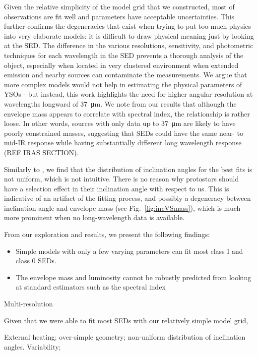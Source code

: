 Given the relative simplicity of the model grid that we constructed, most of observations are fit well and parameters have acceptable uncertainties. This further confirms the degeneracies that exist when trying to put too much physics into very elaborate models: it is difficult to draw physical meaning just by looking at the SED. The difference in the various resolutions, sensitivity, and photometric techniques for each wavelength in the SED prevents a thorough analysis of the object, especially when located in very clustered environment when extended emission and nearby sources can contaminate the measurements. We argue that more complex models would not help in estimating the physical parameters of YSOs - but instead, this work highlights the need for higher angular resolution at wavelengths longward of \SI{37}{\um}. We note from our results that although the envelope mass appears to correlate with spectral index, the relationship is rather loose. In other words, sources with only data up to \SI{37}{\um} are likely to have poorly constrained masses, suggesting that SEDs could have the same near- to mid-IR response while having substantially different long wavelength response (REF IRAS SECTION). 

Similarly to \citet{Furlan:2016df}, we find that the distribution of inclination angles for the best fits is not uniform, which is not intuitive. There is no reason why protostars should have a selection effect in their inclination angle with respect to us. This is indicative of an artifact of the fitting process, and possibly a degeneracy between inclination angle and envelope mass (see Fig.~\ref{fig:incVSmass}), which is much more prominent when no long-wavelength data is available.



From our exploration and results, we present the following findings:
\begin{itemize}
 \item Simple models with only a few varying parameters can fit most class I and class 0 SEDs.
 \item The envelope mass and luminosity cannot be robustly predicted from looking at standard estimators such as the spectral index
 \end{itemize} 

Multi-resolution

Given that we were able to fit most SEDs with our relatively simple model grid, 

External heating; over-simple geometry; non-uniform distribution of inclination angles. Variability;

